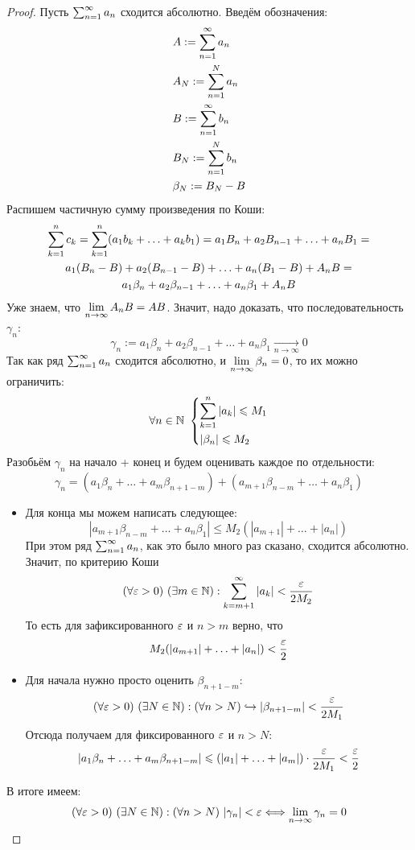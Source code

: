 \begin{proof}
	Пусть $\sum_{n = 1}^\infty a_n$ сходится абсолютно. Введём обозначения:
	\begin{align*}
		&{A := \sum\limits_{n = 1}^\infty a_n}
		\\
		&{A_N := \sum\limits_{n = 1}^N a_n}
		\\
		&{B := \sum\limits_{n = 1}^\infty b_n}
		\\
		&{B_N := \sum\limits_{n = 1}^N b_n}
		\\
		&{\beta_N := B_N - B}
	\end{align*}
	Распишем частичную сумму произведения по Коши:
	\begin{multline*}
		\sum\limits_{k = 1}^n c_k = \sum\limits_{k = 1}^n (a_1 b_k + \ldots + a_k b_1) = a_1 B_n + a_2 B_{n - 1} + \ldots + a_n B_1 =
		\\
		a_1 (B_n - B) + a_2 (B_{n - 1} - B) + \ldots + a_n (B_1 - B) + A_n B =
		\\
		a_1 \beta_n + a_2 \beta_{n - 1} + \ldots + a_n \beta_1 + A_n B
	\end{multline*}
	Уже знаем, что $\lim\limits_{n \to \infty} A_n B = AB$. Значит, надо доказать, что последовательность $\gamma_n$:
	\[
		\gamma_n := a_1 \beta_n + a_2 \beta_{n - 1} + \ldots + a_n \beta_1 \xrightarrow[n \to \infty]{} 0
	\]
	Так как ряд $\sum_{n = 1}^\infty a_n$ сходится абсолютно, и $\lim\limits_{n \to \infty} \beta_n = 0$, то их можно ограничить:
	\[
		\forall n \in \mathbb{N}\ \left\{\begin{aligned}
			&{\sum\limits_{k = 1}^n |a_k| \leqslant M_1}
			\\
			&{|\beta_n| \leqslant M_2}
		\end{aligned}\right.
	\]
	Разобьём $\gamma_n$ на начало + конец и будем оценивать каждое по отдельности:
	\[
		\gamma_n = (a_1 \beta_n + \ldots + a_m \beta_{n + 1 - m}) + (a_{m + 1} \beta_{n - m} + \ldots + a_n \beta_1)
	\]
	\begin{itemize}
		\item Для конца мы можем написать следующее:
		\[
			|a_{m + 1}\beta_{n - m} + \ldots + a_n \beta_1| \le M_2 (|a_{m + 1}| + \ldots + |a_n|)
		\]
		При этом ряд $\sum_{n = 1}^\infty a_n$, как это было много раз сказано, сходится абсолютно. Значит, по критерию Коши
		\[
			(\forall \varepsilon > 0)\ (\exists m \in \mathbb{N}) : \sum\limits_{k = m + 1}^\infty |a_k| < \frac{\varepsilon}{2 M_2}
		\]
		То есть для зафиксированного $\varepsilon$ и $n > m$ верно, что
		\[
			M_2(|a_{m + 1}| + \ldots + |a_n|) < \frac{\varepsilon}{2}
		\]
		
		\item Для начала нужно просто оценить $\beta_{n + 1 - m}$:
		\[
			(\forall \varepsilon > 0)\ (\exists N \in \mathbb{N}) : (\forall n > N) \hookrightarrow |\beta_{n + 1 - m}| < \frac{\varepsilon}{2M_1}
		\]
		Отсюда получаем для фиксированного $\varepsilon$ и $n > N$:
		\[
			|a_1 \beta_n + \ldots + a_m \beta_{n + 1 - m}| \leqslant (|a_1| + \ldots + |a_m|) \cdot \frac{\varepsilon}{2M_1} < \frac{\varepsilon}{2}
		\]
	\end{itemize}
	В итоге имеем:
	\[
		(\forall \eps > 0)\ (\exists N \in \N) : (\forall n > N)\ |\gamma_n| < \eps \llra \liml_{n \to \infty} \gamma_n = 0
 	\]
\end{proof}

